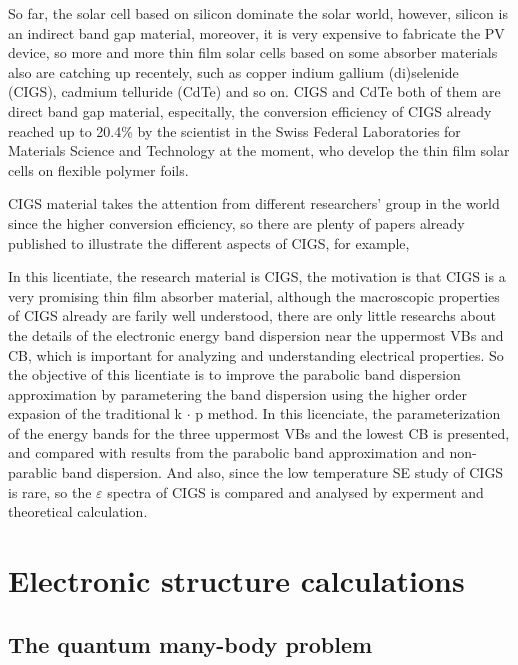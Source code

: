 \documentclass[a4paper, 12pt, titlepage,oneside,drop]{kthesis}
\begin{document}
So far, the solar cell based on silicon dominate the solar world, however, silicon is an indirect band gap material, moreover, it is very expensive to fabricate the PV device,
so more and more thin film solar cells based on some absorber materials also are catching up recentely, such as copper indium gallium (di)selenide (CIGS), cadmium telluride (CdTe) and so on. 
CIGS and CdTe both of them are direct band gap material, especitally, the conversion efficiency of CIGS already reached up to 20.4\% by the scientist in the Swiss Federal Laboratories for Materials Science and Technology at the moment, who develop the thin film solar cells on flexible polymer foils.

CIGS material takes the attention from different researchers' group in the world since the higher conversion efficiency, so there are plenty of papers already published to 
illustrate the different aspects of CIGS, for example,


In this licentiate, the research material is CIGS, the motivation is that CIGS is a very promising thin film absorber material, although the macroscopic properties of CIGS already
are farily well understood, there are only little researchs about the details of the electronic energy band dispersion near the uppermost VBs and CB, which is important
for analyzing and understanding electrical properties. So the objective of this licentiate is to improve the parabolic band dispersion approximation by parametering the band dispersion using the higher order expasion of the traditional k $\cdot$ p method. In this
licenciate, the parameterization of the energy bands for the three uppermost VBs and the lowest CB is presented, and compared with results from the parabolic band approximation
and non-parablic band dispersion. And also, since the low temperature SE study of CIGS is rare, so the ${\varepsilon}$ spectra of CIGS is compared and analysed by 
experment and theoretical calculation. 





\chapter{Electronic structure calculations }
\label{ch:dft}

\section{The quantum many-body problem}
\label{ch:mb}
\end{document}
